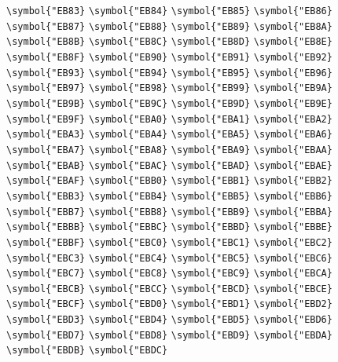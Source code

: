 \documentclass{ctexbook}
\begin{document}
 \verb|\symbol{"EB83}|  \verb|\symbol{"EB84}|  \verb|\symbol{"EB85}|  \verb|\symbol{"EB86}|  \verb|\symbol{"EB87}|  \verb|\symbol{"EB88}|  \verb|\symbol{"EB89}|  \verb|\symbol{"EB8A}|  \verb|\symbol{"EB8B}|  \verb|\symbol{"EB8C}|  \verb|\symbol{"EB8D}|  \verb|\symbol{"EB8E}|  \verb|\symbol{"EB8F}|  \verb|\symbol{"EB90}|  \verb|\symbol{"EB91}|  \verb|\symbol{"EB92}|  \verb|\symbol{"EB93}|  \verb|\symbol{"EB94}|  \verb|\symbol{"EB95}|  \verb|\symbol{"EB96}|  \verb|\symbol{"EB97}|  \verb|\symbol{"EB98}|  \verb|\symbol{"EB99}|  \verb|\symbol{"EB9A}|  \verb|\symbol{"EB9B}|  \verb|\symbol{"EB9C}|  \verb|\symbol{"EB9D}|  \verb|\symbol{"EB9E}|  \verb|\symbol{"EB9F}|  \verb|\symbol{"EBA0}|  \verb|\symbol{"EBA1}|  \verb|\symbol{"EBA2}|  \verb|\symbol{"EBA3}|  \verb|\symbol{"EBA4}|  \verb|\symbol{"EBA5}|  \verb|\symbol{"EBA6}|  \verb|\symbol{"EBA7}|  \verb|\symbol{"EBA8}|  \verb|\symbol{"EBA9}|  \verb|\symbol{"EBAA}|  \verb|\symbol{"EBAB}|  \verb|\symbol{"EBAC}|  \verb|\symbol{"EBAD}|  \verb|\symbol{"EBAE}|  \verb|\symbol{"EBAF}|  \verb|\symbol{"EBB0}|  \verb|\symbol{"EBB1}|  \verb|\symbol{"EBB2}|  \verb|\symbol{"EBB3}|  \verb|\symbol{"EBB4}|  \verb|\symbol{"EBB5}|  \verb|\symbol{"EBB6}|  \verb|\symbol{"EBB7}|  \verb|\symbol{"EBB8}|  \verb|\symbol{"EBB9}|  \verb|\symbol{"EBBA}|  \verb|\symbol{"EBBB}|  \verb|\symbol{"EBBC}|  \verb|\symbol{"EBBD}|  \verb|\symbol{"EBBE}|  \verb|\symbol{"EBBF}|  \verb|\symbol{"EBC0}|  \verb|\symbol{"EBC1}|  \verb|\symbol{"EBC2}|  \verb|\symbol{"EBC3}|  \verb|\symbol{"EBC4}|  \verb|\symbol{"EBC5}|  \verb|\symbol{"EBC6}|  \verb|\symbol{"EBC7}|  \verb|\symbol{"EBC8}|  \verb|\symbol{"EBC9}|  \verb|\symbol{"EBCA}|  \verb|\symbol{"EBCB}|  \verb|\symbol{"EBCC}|  \verb|\symbol{"EBCD}|  \verb|\symbol{"EBCE}|  \verb|\symbol{"EBCF}|  \verb|\symbol{"EBD0}|  \verb|\symbol{"EBD1}|  \verb|\symbol{"EBD2}|  \verb|\symbol{"EBD3}|  \verb|\symbol{"EBD4}|  \verb|\symbol{"EBD5}|  \verb|\symbol{"EBD6}|  \verb|\symbol{"EBD7}|  \verb|\symbol{"EBD8}|  \verb|\symbol{"EBD9}|  \verb|\symbol{"EBDA}|  \verb|\symbol{"EBDB}|  \verb|\symbol{"EBDC}| 
\end{document}

